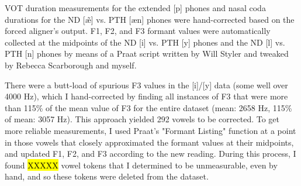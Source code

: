 VOT duration measurements for the extended [p] phones and nasal coda durations for the ND [\~{\ae}] vs. PTH [\ae n] phones were hand-corrected based on the forced aligner's output. %
F1, F2, and F3 formant values were automatically collected at the midpoints of the ND [i] vs. PTH [y] phones and the ND [l] vs. PTH [n] phones by means of a Praat script written by Will Styler and tweaked by Rebecca Scarborough and myself.

There were a butt-load of spurious F3 values in the [i]/[y] data (some well over 4000 Hz), which I hand-corrected by finding all instances of F3 that were more than 115\% of the mean value of F3 for the entire dataset (mean: 2658 Hz, 115\% of mean: 3057 Hz). This approach yielded 292 vowels to be corrected. To get more reliable measurements, I used Praat's "Formant Listing" function at a point in those vowels that closely approximated the formant values at their midpoints, and updated F1, F2, and F3 according to the new reading. During this process, I found \hl{XXXXX} vowel tokens that I determined to be unmeasurable, even by hand, and so these tokens were deleted from the dataset. 

